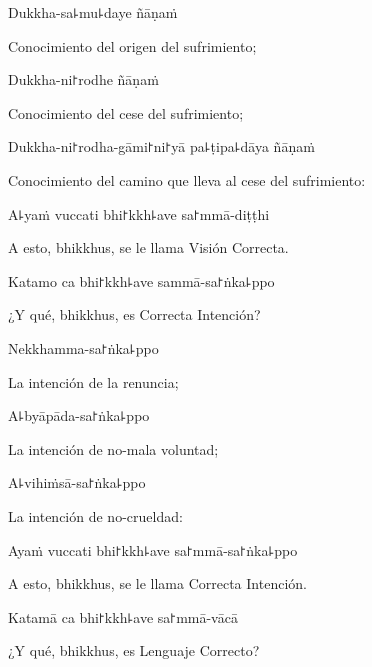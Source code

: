 Dukkha-sa꜕mu꜕daye ñāṇaṁ

\begin{english}
	Conocimiento del origen del sufrimiento;
\end{english}

Dukkha-ni꜓rodhe ñāṇaṁ

\begin{english}
	Conocimiento del cese del sufrimiento;
\end{english}

Dukkha-ni꜓rodha-gāmi꜓ni꜓yā pa꜕ṭipa꜕dāya ñāṇaṁ

\begin{english}
	Conocimiento del camino que lleva al cese del sufrimiento:
\end{english}

A꜕yaṁ vuccati bhi꜓kkh꜕ave sa꜓mmā-diṭṭhi

\begin{english}
	A esto, bhikkhus, se le llama Visión Correcta.
\end{english}

Katamo ca bhi꜓kkh꜕ave sammā-sa꜓ṅka꜕ppo

\begin{english}
	¿Y qué, bhikkhus, es Correcta Intención?
\end{english}

\ifaivedition
\clearpage
\fi

Nekkhamma-sa꜓ṅka꜕ppo

\begin{english}
	La intención de la renuncia;
\end{english}

A꜕byāpāda-sa꜓ṅka꜕ppo

\begin{english}
	La intención de no-mala voluntad;
\end{english}

A꜕vihiṁsā-sa꜓ṅka꜕ppo

\begin{english}
	La intención de no-crueldad:
\end{english}

Ayaṁ vuccati bhi꜓kkh꜕ave sa꜓mmā-sa꜓ṅka꜕ppo

\begin{english}
	A esto, bhikkhus, se le llama Correcta Intención.
\end{english}

Katamā ca bhi꜓kkh꜕ave sa꜓mmā-vācā

\begin{english}
	¿Y qué, bhikkhus, es Lenguaje Correcto?
\end{english}


